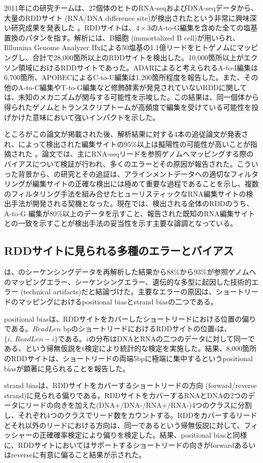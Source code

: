 2011年に\cite{pmid21596952}の研究チームは、27個体のヒトのRNA-seqおよびDNA-seqデータから、大量のRDDサイト (RNA/DNA difference site)が検出されたという非常に興味深い研究成果を発表した \citep{pmid21596952}。RDDサイトは、$4\times3$のA-to-G編集を含めた全ての塩基置換のパタンを指す。解析には、B細胞 (immortalized B cell)が用いられ、Illlumina Genome Analyzer IIxによる50塩基の1.1億リードをヒトゲノムにマッピングし、合計で28,000箇所以上のRDDサイトを検出した。10,000箇所以上がエクソン領域におけるRDDサイトであった。ADARによると考えられるA-to-I編集は6,700箇所、APOBECによるC-to-U編集は1,200箇所程度を報告した。また、その他のA-to-C編集やT-to-G編集など修飾酵素が発見されていないRDDに関しては、未知のメカニズムが関与する可能性を示唆した。この結果は、同一個体から得られたゲノムとトランスクリプトームが高頻度で編集を受けている可能性を投げかけた意味において強いインパクトを示した。
\par
ところがこの論文が掲載された後、解析結果に対する4本の追従論文が発表され、\cite{pmid21596952}によって検出された編集サイトの95\%以上は擬陽性の可能性が高いことが指摘された \citep{pmid22422962, pmid22422964, pmid22422963, pmid22022455}。論文では、主にRNA-seqリードを参照ゲノムへマッピングする際のバイアスについて検証が行われ、多くのエラーとその原因が報告された。こういった背景から、\cite{pmid21596952}の研究とその追証は、アラインメントデータへの適切なフィルタリングが編集サイトの正確な検出には極めて重要な過程であることを示し、複数のフィルタリング手法を組み合せたヒューリスティックなRNA編集サイトの検出手法が開発される契機となった。現在では、検出される全体のRDDのうち、A-to-G 編集が80\%以上のデータを示すこと、報告された既知のRNA編集サイトとの一致を示すことが検出手法の妥当性を示す主要な論調となっている。

\subsection{RDDサイトに見られる多種のエラーとバイアス}
\cite{pmid22422963}は、\cite{pmid21596952}のシーケンシングデータを再解析した結果から88\%から93\%が参照ゲノムへのマッピングエラー、シーケンシングエラー、遺伝的な多型に起因した技術的エラー (technical artifacts)だと結論づけた。主要なエラーの原因は、ショートリードのマッピングにおけるpositional biasとstrand biasの二つである。
\par
positional biasは、RDDサイトをカバーしたショートリードにおける位置の偏りである。$ReadLen$ bpのショートリードにおけるRDDサイトの位置$i$は、$\{i,\ ReadLen-i\}$である。$i$の分布はDNAとRNAの二つのデータに対して同一である、という帰無仮説をt検定により統計的な検定を実施した。結果、8,000箇所のRDDサイトは、ショートリードの両端5bpに極端に集中するというpositional biasが顕著に見られることを報告した。
\par
strand biasは、RDDサイトをカバーするショートリードの方向 (forward/reverse strand)に見られる偏りである。RDDサイトをカバーするRNAとDNAの2つのデータにリードの向きを加えた(DNA+/DNA-/RNA+/RNA-)4つのクラスに分割し、それぞれ4つのクラスでリード数をカウントする。RDDをカバーするリードとそれ以外のリードにおける方向は、同一であるという帰無仮説に対して、フィッシャーの正確確率検定により偏りを検定した。結果、positional biasと同様に、RDDサイトにおいてはサポートするショートリードの向きがforwardあるいはreverseに有意に偏ること結果が示された。


